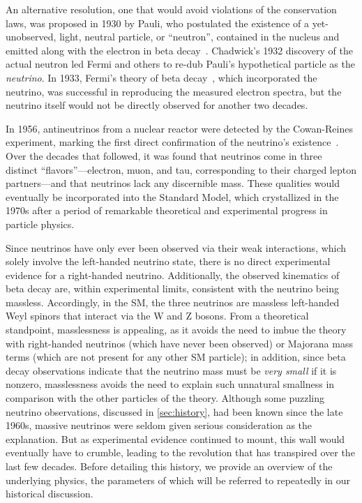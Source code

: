 \documentclass[../thesis.tex]{subfiles}
\begin{document}
An alternative resolution, one that would avoid violations of the conservation laws, was proposed in 1930 by Pauli, who postulated the existence of a yet-unobserved, light, neutral particle, or ``neutron'', contained in the nucleus and emitted along with the electron in beta decay~\cite{Pauli:83282}. Chadwick's 1932 discovery of the actual neutron led Fermi and others to re-dub Pauli's hypothetical particle as the \emph{neutrino}. In 1933, Fermi's theory of beta decay~\cite{Fermi1934TentativoDU}, which incorporated the neutrino, was successful in reproducing the measured electron spectra, but the neutrino itself would not be directly observed for another two decades.

In 1956, antineutrinos from a nuclear reactor were detected by the Cowan-Reines experiment, marking the first direct confirmation of the neutrino's existence~\cite{Cowan103}. Over the decades that followed, it was found that neutrinos come in three distinct ``flavors''---electron, muon, and tau, corresponding to their charged lepton partners---and that neutrinos lack any discernible mass. These qualities would eventually be incorporated into the Standard Model, which crystallized in the 1970s after a period of remarkable theoretical and experimental progress in particle physics.

Since neutrinos have only ever been observed via their weak interactions, which solely involve the left-handed neutrino state, there is no direct experimental evidence for a right-handed neutrino. Additionally, the observed kinematics of beta decay are, within experimental limits, consistent with the neutrino being massless. Accordingly, in the SM, the three neutrinos are massless left-handed Weyl spinors that interact via the W and Z bosons. From a theoretical standpoint, masslessness is appealing, as it avoids the need to imbue the theory with right-handed neutrinos (which have never been observed) or Majorana mass terms (which are not present for any other SM particle); in addition, since beta decay observations indicate that the neutrino mass must be \emph{very small} if it is nonzero, masslessness avoids the need to explain such unnatural smallness in comparison with the other particles of the theory. Although some puzzling neutrino observations, discussed in \ref{sec:history}, had been known since the late 1960s, massive neutrinos were seldom given serious consideration as the explanation. But as experimental evidence continued to mount, this wall would eventually have to crumble, leading to the revolution that has transpired over the last few decades. Before detailing this history, we provide an overview of the underlying physics, the parameters of which will be referred to repeatedly in our historical discussion.
\end{document}

